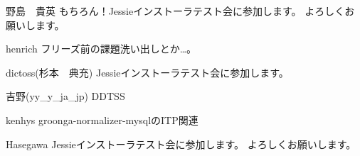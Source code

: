 \begin{prework}{ 野島　貴英 }
もちろん！Jessieインストーラテスト会に参加します。
よろしくお願いします。
\end{prework}

\begin{prework}{ henrich }
フリーズ前の課題洗い出しとか…。
\end{prework}

\begin{prework}{ dictoss(杉本　典充) }
Jessieインストーラテスト会に参加します。
\end{prework}

\begin{prework}{ 吉野(yy\_{}y\_{}ja\_{}jp) }
DDTSS
\end{prework}

\begin{prework}{ kenhys }
groonga-normalizer-mysqlのITP関連
\end{prework}

\begin{prework}{ Hasegawa }
Jessieインストーラテスト会に参加します。
よろしくお願いします。
\end{prework}
